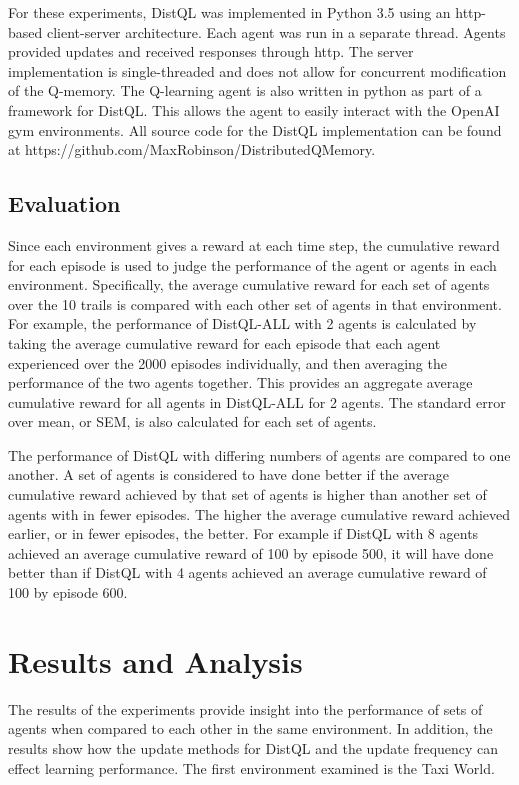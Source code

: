 \documentclass[jair,twoside,11pt,theapa]{article}
\begin{document}
For these experiments, DistQL was implemented in Python 3.5 using an http-based client-server architecture. Each agent was run in a separate thread. Agents provided updates and received responses through http. The server implementation is single-threaded and does not allow for concurrent modification of the Q-memory. The Q-learning agent is also written in python as part of a framework for DistQL. This allows the agent to easily interact with the OpenAI gym environments. All source code for the DistQL implementation can be found at https://github.com/MaxRobinson/DistributedQMemory.

\subsection{Evaluation} 
\label{evaluation}
Since each environment gives a reward at each time step, the cumulative reward for each episode is used to judge the performance of the agent or agents in each environment. Specifically, the average cumulative reward for each set of agents over the 10 trails is compared with each other set of agents in that environment. For example, the performance of DistQL-ALL with 2 agents is calculated by taking the average cumulative reward for each episode that each agent experienced over the 2000 episodes individually, and then averaging the performance of the two agents together. This provides an aggregate average cumulative reward for all agents in DistQL-ALL for 2 agents. The standard error over mean, or SEM, is also calculated for each set of agents.

The performance of DistQL with differing numbers of agents are compared to one another. A set of agents is considered to have done better if the average cumulative reward achieved by that set of agents is higher than another set of agents with in fewer episodes. The higher the average cumulative reward achieved earlier, or in fewer episodes, the better. For example if DistQL with 8 agents achieved an average cumulative reward of 100 by episode 500, it will have done better than if DistQL with 4 agents achieved an average cumulative reward of 100 by episode 600.

\section{Results and Analysis}
\label{results}
The results of the experiments provide insight into the performance of sets of agents when compared to each other in the same environment. In addition, the results show how the update methods for DistQL and the update frequency can effect learning performance. The first environment examined is the Taxi World. 
\end{document}
